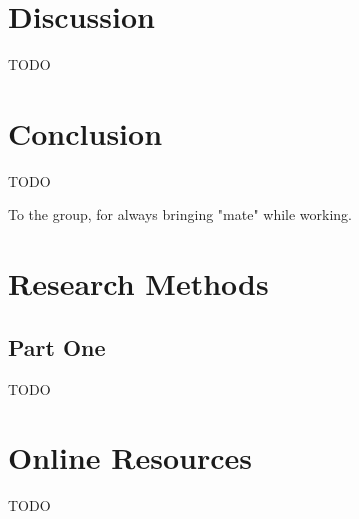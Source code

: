 \documentclass[sigconf]{acmart}
\begin{document}
\section{Discussion}
TODO

\section{Conclusion}
TODO

\begin{acks}
To the group, for always bringing "mate" while working.
\end{acks}





\appendix

\section{Research Methods}

\subsection{Part One}
TODO

\section{Online Resources}
TODO
\end{document}
